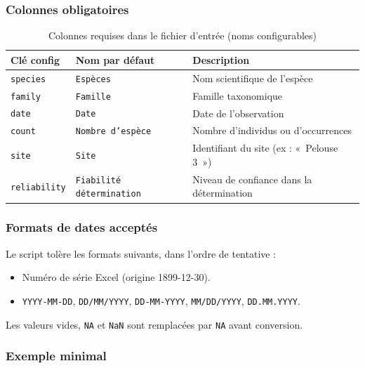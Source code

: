 \documentclass[11pt,a4paper]{article}
\begin{document}
\subsubsection{Colonnes obligatoires}

\begin{table}[htbp]
  \centering
  \caption{Colonnes requises dans le fichier d'entrée (noms configurables)}
  \begin{tabularx}{\textwidth}{llX}
    \toprule
    \textbf{Clé config} & \textbf{Nom par défaut} & \textbf{Description} \\
    \midrule
    \texttt{species}     & \texttt{Espèces}               & Nom scientifique de l'espèce \\
    \texttt{family}      & \texttt{Famille}               & Famille taxonomique \\
    \texttt{date}        & \texttt{Date}                  & Date de l'observation \\
    \texttt{count}       & \texttt{Nombre d'espèce}       & Nombre d'individus ou d'occurrences \\
    \texttt{site}        & \texttt{Site}                  & Identifiant du site (ex : «~Pelouse 3~») \\
    \texttt{reliability} & \texttt{Fiabilité détermination} & Niveau de confiance dans la détermination \\
    \bottomrule
  \end{tabularx}
\end{table}

\subsubsection{Formats de dates acceptés}

Le script tolère les formats suivants, dans l'ordre de tentative :
\begin{itemize}
  \item Numéro de série Excel (origine 1899-12-30).
  \item \texttt{YYYY-MM-DD}, \texttt{DD/MM/YYYY}, \texttt{DD-MM-YYYY}, \texttt{MM/DD/YYYY}, \texttt{DD.MM.YYYY}.
\end{itemize}

Les valeurs vides, \texttt{NA} et \texttt{NaN} sont remplacées par \texttt{NA} avant conversion.

\subsubsection{Exemple minimal}
\end{document}
